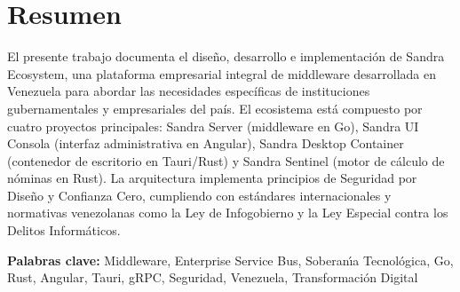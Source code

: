 \chapter*{Resumen}

El presente trabajo documenta el dise\~no, desarrollo e implementaci\'on de Sandra Ecosystem, una plataforma empresarial integral de middleware desarrollada en Venezuela para abordar las necesidades espec\'ificas de instituciones gubernamentales y empresariales del pa\'is. El ecosistema est\'a compuesto por cuatro proyectos principales: Sandra Server (middleware en Go), Sandra UI Consola (interfaz administrativa en Angular), Sandra Desktop Container (contenedor de escritorio en Tauri/Rust) y Sandra Sentinel (motor de c\'alculo de n\'ominas en Rust). La arquitectura implementa principios de Seguridad por Dise\~no y Confianza Cero, cumpliendo con est\'andares internacionales y normativas venezolanas como la Ley de Infogobierno y la Ley Especial contra los Delitos Inform\'aticos.

\vspace{0.5cm}
\noindent\textbf{Palabras clave:} Middleware, Enterprise Service Bus, Soberan\'{\i}a Tecnol\'ogica, Go, Rust, Angular, Tauri, gRPC, Seguridad, Venezuela, Transformaci\'on Digital

\newpage

